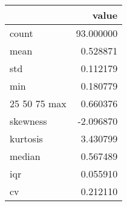 \begin{tabular}{lr}
\toprule
 & value \\
\midrule
count & 93.000000 \\
mean & 0.528871 \\
std & 0.112179 \\
min & 0.180779 \\
25%
50%
75%
max & 0.660376 \\
skewness & -2.096870 \\
kurtosis & 3.430799 \\
median & 0.567489 \\
iqr & 0.055910 \\
cv & 0.212110 \\
\bottomrule
\end{tabular}

